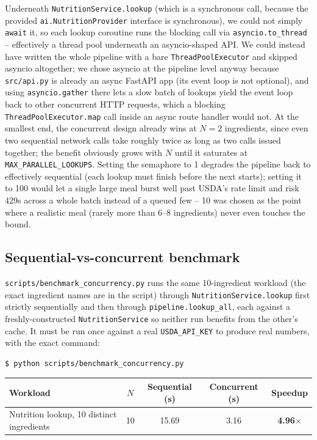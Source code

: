 \documentclass[11pt,a4paper]{article}
\begin{document}
Underneath \texttt{NutritionService.lookup} (which is a synchronous call, because the provided \texttt{ai.NutritionProvider} interface is synchronous), we could not simply \texttt{await} it, so each lookup coroutine runs the blocking call via \texttt{asyncio.to\_thread} -- effectively a thread pool underneath an asyncio-shaped API. We could instead have written the whole pipeline with a bare \texttt{ThreadPoolExecutor} and skipped asyncio altogether; we chose asyncio at the pipeline level anyway because \texttt{src/api.py} is already an async FastAPI app (its event loop is not optional), and using \texttt{asyncio.gather} there lets a slow batch of lookups yield the event loop back to other concurrent HTTP requests, which a blocking \texttt{ThreadPoolExecutor.map} call inside an async route handler would not. At the smallest end, the concurrent design already wins at $N=2$ ingredients, since even two sequential network calls take roughly twice as long as two calls issued together; the benefit obviously grows with $N$ until it saturates at \texttt{MAX\_PARALLEL\_LOOKUPS}. Setting the semaphore to 1 degrades the pipeline back to effectively sequential (each lookup must finish before the next starts); setting it to 100 would let a single large meal burst well past USDA's rate limit and risk 429s across a whole batch instead of a queued few -- 10 was chosen as the point where a realistic meal (rarely more than 6--8 ingredients) never even touches the bound.

\subsection{Sequential-vs-concurrent benchmark}

\texttt{scripts/benchmark\_concurrency.py} runs the same 10-ingredient workload (the exact ingredient names are in the script) through \texttt{NutritionService.lookup} first strictly sequentially and then through \texttt{pipeline.lookup\_all}, each against a freshly-constructed \texttt{NutritionService} so neither run benefits from the other's cache. It must be run once against a real \texttt{USDA\_API\_KEY} to produce real numbers, with the exact command:

\begin{lstlisting}[style=python,language=bash,numbers=none]
$ python scripts/benchmark_concurrency.py
\end{lstlisting}

\begin{center}\small
\begin{tabular}{lcccc}
\toprule
\textbf{Workload} & $N$ & \textbf{Sequential (s)} & \textbf{Concurrent (s)} & \textbf{Speedup} \\
\midrule
Nutrition lookup, 10 distinct ingredients & 10 & 15.69 & 3.16 & \textbf{4.96$\times$} \\
\bottomrule
\end{tabular}
\end{center}
\end{document}
